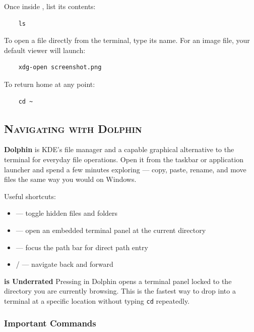 \documentclass{article}
\newcommand{\code}[1]{\colorbox{codebg}{\texttt{#1}}}
\begin{document}
Once inside , list its contents:

\begin{verbatim}
	ls
\end{verbatim}

To open a file directly from the terminal, type its name. For an image file, your
default viewer will launch:

\begin{verbatim}
	xdg-open screenshot.png
\end{verbatim}

To return home at any point:

\begin{verbatim}
	cd ~
\end{verbatim}

\subsection{\textsc{Navigating with Dolphin}}

\textbf{Dolphin} is KDE's file manager and a capable graphical alternative to the
terminal for everyday file operations. Open it from the taskbar or application
launcher and spend a few minutes exploring --- copy, paste, rename, and move files
the same way you would on Windows.

Useful shortcuts:

\begin{itemize}[leftmargin=1.5em, nosep, label={\tiny\textbullet}]
	\item {} --- toggle hidden files and folders
	\item {} --- open an embedded terminal panel at the current directory
	\item {} --- focus the path bar for direct path entry
	\item {} /  --- navigate back and forward
\end{itemize}

\begin{callout}{\textbf{ is Underrated}}
	Pressing  in Dolphin opens a terminal panel locked to the directory you
	are currently browsing. This is the fastest way to drop into a terminal at a
	specific location without typing \code{cd} repeatedly.
\end{callout}

\subsubsection{Important Commands}
\end{document}
